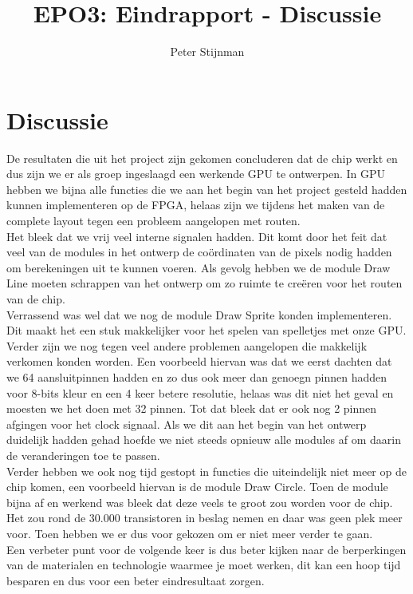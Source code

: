 \documentclass{scrartcl} %
\author{Peter Stijnman}
\title{EPO3: Eindrapport - Discussie}
\begin{document}
\chapter{Discussie}
\label{ch:discussie}

De resultaten die uit het project zijn gekomen concluderen dat de chip werkt en dus zijn we er als groep ingeslaagd een werkende GPU te ontwerpen. In GPU hebben we bijna alle functies die we aan het begin van het project gesteld hadden kunnen implementeren op de FPGA, helaas zijn we tijdens het maken van de complete layout tegen een probleem aangelopen met routen.\\
Het bleek dat we vrij veel interne signalen hadden. Dit komt door het feit dat veel van de modules in het ontwerp de coördinaten van de pixels nodig hadden om berekeningen uit te kunnen voeren.  Als gevolg hebben we de module Draw Line moeten schrappen van het ontwerp om zo ruimte te creëren voor het routen van de chip.\\
Verrassend was wel dat we nog de module Draw Sprite konden implementeren. Dit maakt het een stuk makkelijker voor het spelen van spelletjes met onze GPU.\\
Verder zijn we nog tegen veel andere problemen aangelopen die makkelijk verkomen konden worden. Een voorbeeld hiervan was dat we eerst dachten dat we 64 aansluitpinnen hadden en zo dus ook meer dan genoegn pinnen hadden voor 8-bits kleur en een 4 keer betere resolutie, helaas was dit niet het geval en moesten we het doen met 32 pinnen. Tot dat bleek dat er ook nog 2 pinnen afgingen voor het clock signaal. Als we dit aan het begin van het ontwerp duidelijk hadden gehad hoefde we niet steeds opnieuw alle modules af om daarin de veranderingen toe te passen.\\
Verder hebben we ook nog tijd gestopt in functies die uiteindelijk niet meer op de chip komen, een voorbeeld hiervan is de module Draw Circle. Toen de module bijna af en werkend was bleek dat deze veels te groot zou worden voor de chip. Het zou rond de 30.000 transistoren in beslag nemen en daar was geen plek meer voor. Toen hebben we er dus voor gekozen om er niet meer verder te gaan.\\
Een verbeter punt voor de volgende keer is dus beter kijken naar de berperkingen van de materialen en technologie waarmee je moet werken, dit kan een hoop tijd besparen en dus voor een beter eindresultaat zorgen.
\end{document}

